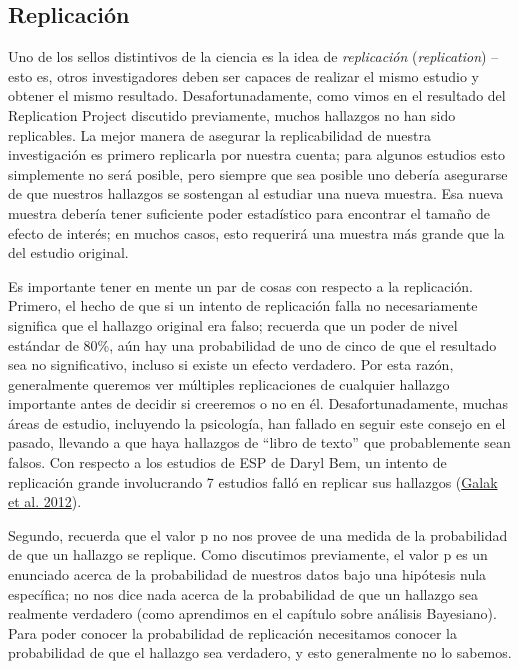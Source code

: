 \documentclass[
  12pt,
]{book}
\begin{document}
\hypertarget{replicaciuxf3n}{%
\subsection{Replicación}\label{replicaciuxf3n}}

Uno de los sellos distintivos de la ciencia es la idea de \emph{replicación} (\emph{replication}) -- esto es, otros investigadores deben ser capaces de realizar el mismo estudio y obtener el mismo resultado. Desafortunadamente, como vimos en el resultado del Replication Project discutido previamente, muchos hallazgos no han sido replicables. La mejor manera de asegurar la replicabilidad de nuestra investigación es primero replicarla por nuestra cuenta; para algunos estudios esto simplemente no será posible, pero siempre que sea posible uno debería asegurarse de que nuestros hallazgos se sostengan al estudiar una nueva muestra. Esa nueva muestra debería tener suficiente poder estadístico para encontrar el tamaño de efecto de interés; en muchos casos, esto requerirá una muestra más grande que la del estudio original.

Es importante tener en mente un par de cosas con respecto a la replicación. Primero, el hecho de que si un intento de replicación falla no necesariamente significa que el hallazgo original era falso; recuerda que un poder de nivel estándar de 80\%, aún hay una probabilidad de uno de cinco de que el resultado sea no significativo, incluso si existe un efecto verdadero. Por esta razón, generalmente queremos ver múltiples replicaciones de cualquier hallazgo importante antes de decidir si creeremos o no en él. Desafortunadamente, muchas áreas de estudio, incluyendo la psicología, han fallado en seguir este consejo en el pasado, llevando a que haya hallazgos de ``libro de texto'' que probablemente sean falsos. Con respecto a los estudios de ESP de Daryl Bem, un intento de replicación grande involucrando 7 estudios falló en replicar sus hallazgos (\protect\hyperlink{ref-gala:lebo:nels:2012}{Galak et al. 2012}).

Segundo, recuerda que el valor p no nos provee de una medida de la probabilidad de que un hallazgo se replique. Como discutimos previamente, el valor p es un enunciado acerca de la probabilidad de nuestros datos bajo una hipótesis nula específica; no nos dice nada acerca de la probabilidad de que un hallazgo sea realmente verdadero (como aprendimos en el capítulo sobre análisis Bayesiano). Para poder conocer la probabilidad de replicación necesitamos conocer la probabilidad de que el hallazgo sea verdadero, y esto generalmente no lo sabemos.
\end{document}
